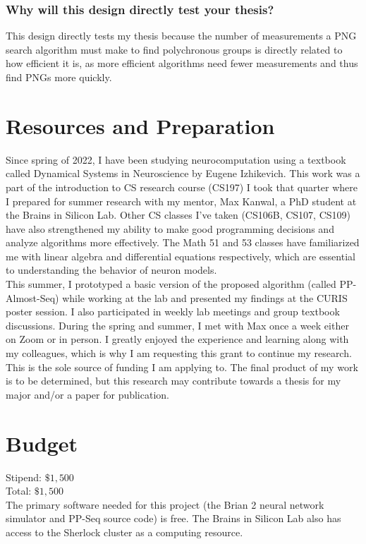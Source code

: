 \documentclass{sigchi}
\begin{document}
\subsubsection{Why will this design directly test your thesis?}
This design directly tests my thesis because the number of measurements a PNG search algorithm must make to find polychronous groups is directly related to how efficient it is, as more efficient algorithms need fewer measurements and thus find PNGs more quickly. 
\section{Resources and Preparation}
Since spring of 2022, I have been studying neurocomputation using a textbook called Dynamical Systems in Neuroscience by Eugene Izhikevich. This work was a part of the introduction to CS research course (CS197) I took that quarter where I prepared for summer research with my mentor, Max Kanwal, a PhD student at the Brains in Silicon Lab. Other CS classes I've taken (CS106B, CS107, CS109) have also strengthened my ability to make good programming decisions and analyze algorithms more effectively. The Math 51 and 53 classes have familiarized me with linear algebra and differential equations respectively, which are essential to understanding the behavior of neuron models.\\
This summer, I prototyped a basic version of the proposed algorithm (called PP-Almost-Seq) while working at the lab and presented my findings at the CURIS poster session. I also participated in weekly lab meetings and group textbook discussions. During the spring and summer, I met with Max once a week either on Zoom or in person. I greatly enjoyed the experience and learning along with my colleagues, which is why I am requesting this grant to continue my research. This is the sole source of funding I am applying to. The final product of my work is to be determined, but this research may contribute towards a thesis for my major and/or a paper for publication.
\section{Budget}
Stipend: $\$1,500$\\
Total: $\$1,500$\\
The primary software needed for this project (the Brian 2 neural network simulator and PP-Seq source code) is free. The Brains in Silicon Lab also has access to the Sherlock cluster as a computing resource.\\ 

\balance{}

\end{document}
